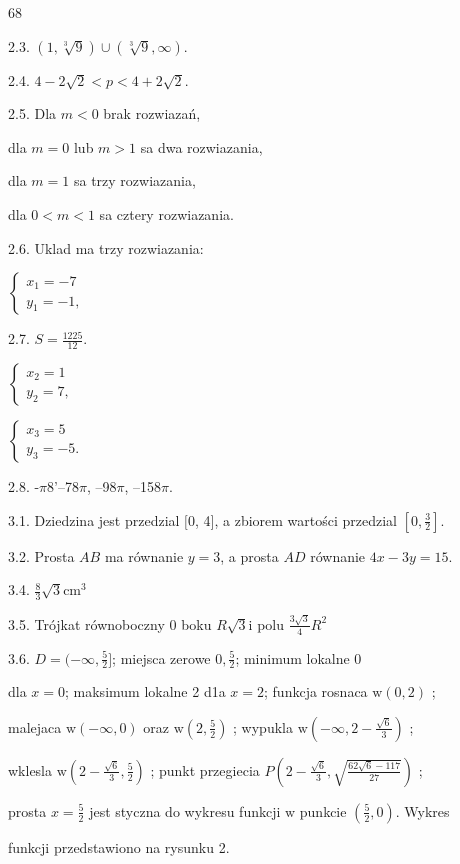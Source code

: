 \documentclass[a4paper,12pt]{article}
\begin{document}
68

2.3. $(1,\sqrt[3]{9})\cup(\sqrt[3]{9},\infty).$

2.4. $4-2\sqrt{2}<p<4+2\sqrt{2}.$

2.5. Dla $m<0$ brak rozwiazań,

dla $m=0$ lub $m>1$ sa dwa rozwiazania,

dla $m=1$ sa trzy rozwiazania,

dla $0<m<1$ sa cztery rozwiazania.

2.6. Uklad ma trzy rozwiazania:

$\left\{\begin{array}{l}
x_{1}=-7\\
y_{1}=-1,
\end{array}\right.$

2.7. $S=\displaystyle \frac{1225}{12}.$

$\left\{\begin{array}{l}
x_{2}=1\\
y_{2}=7,
\end{array}\right.$

$\left\{\begin{array}{l}
x_{3}=5\\
y_{3}=-5.
\end{array}\right.$

2.8. -$\pi$8'--78$\pi$, --98$\pi$, --158$\pi$.

3.1. Dziedzina jest przedzial $[0$, 4$]$, a zbiorem wartości przedzial $[0,\displaystyle \frac{3}{2}]$.

3.2. Prosta $AB$ ma równanie $y=3$, a prosta $AD$ równanie $4x-3y=15$.

3.4. $\displaystyle \frac{8}{3}\sqrt{3}\mathrm{c}\mathrm{m}^{3}$

3.5. Trójkat równoboczny $0$ boku $R\sqrt{3}\mathrm{i}$ polu $\displaystyle \frac{3\sqrt{3}}{4}R^{2}$

3.6. $D = (-\displaystyle \infty,\frac{5}{2}]$; miejsca zerowe $0, \displaystyle \frac{5}{2}$; minimum lokalne 0

dla $x = 0$; maksimum lokalne 2 d1a $x = 2$; funkcja rosnaca $\mathrm{w} (0,2)$ ;

malejaca $\mathrm{w} (-\infty,0)$ oraz $\mathrm{w} (2,\displaystyle \frac{5}{2})$ ; wypukla $\mathrm{w} (-\displaystyle \infty,2-\frac{\sqrt{6}}{3})$ ;

wklesla $\mathrm{w} (2-\displaystyle \frac{\sqrt{6}}{3},\frac{5}{2})$ ; punkt przegiecia $P(2-\displaystyle \frac{\sqrt{6}}{3},\sqrt{\frac{62\sqrt{6}-117}{27}})$ ;

prosta $x= \displaystyle \frac{5}{2}$ jest styczna do wykresu funkcji $\mathrm{w}$ punkcie $(\displaystyle \frac{5}{2},0)$. Wykres

funkcji przedstawiono na rysunku 2.
\end{document}
